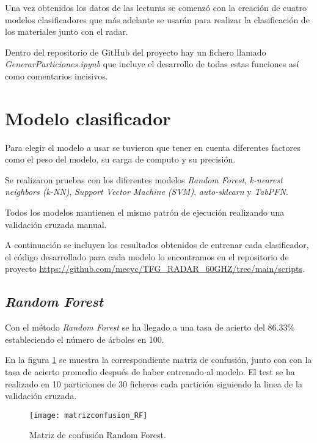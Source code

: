 Una vez obtenidos los datos de las lecturas se comenzó con la creación de cuatro modelos clasificadores que más adelante se usarán para realizar la clasificación de los materiales junto con el radar.

Dentro del repositorio de GitHub del proyecto hay un fichero llamado \textit{GenerarParticiones.ipynb} que incluye el desarrollo de todas estas funciones así como comentarios incisivos.

\section{Modelo clasificador}
Para elegir el modelo a usar se tuvieron que tener en cuenta diferentes factores como el peso del modelo, su carga de computo y su precisión.

Se realizaron pruebas con los diferentes modelos \textit{Random Forest}, \textit{k-nearest neighbors (k-NN)}, \textit{Support Vector Machine (SVM)}, \textit{auto-sklearn} y \textit{TabPFN}. 

Todos los modelos mantienen el mismo patrón de ejecución realizando una validación cruzada manual.

A continuación se incluyen los resultados obtenidos de entrenar cada clasificador, el código desarrollado para cada modelo lo encontramos en el repositorio de proyecto \url{https://github.com/mecyc/TFG_RADAR_60GHZ/tree/main/scripts}.

\clearpage

\subsection{\textit{Random Forest}}

Con el método \textit{Random Forest} se ha llegado a una tasa de acierto del 86.33\% estableciendo el número de árboles en 100.

En la figura \ref{fig:matrizconfusion_RF} se muestra la correspondiente matriz de confusión, junto con con la tasa de acierto promedio después de haber entrenado al modelo. El test se ha realizado en 10 particiones de 30 ficheros cada partición siguiendo la linea de la validación cruzada.
\begin{figure}[h]
\begin{center}
	\texttt{[image: matrizconfusion\_RF]}
	\caption{Matriz de confusión Random Forest.}
	\label{fig:matrizconfusion_RF}
\end{center}
\end{figure}


